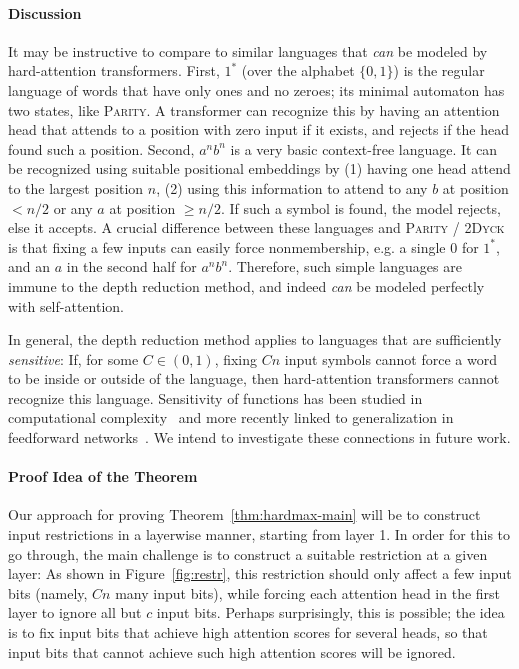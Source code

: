 \documentclass[11pt,a4paper]{article}
\begin{document}
\paragraph{Discussion}
It may be instructive to compare to similar languages that \emph{can} be modeled by hard-attention transformers.
First, $1^*$ (over the alphabet $\{0,1\}$) is the regular language of words that have only ones and no zeroes; its minimal automaton has two states, like \textsc{Parity}.
A transformer can recognize this by having an attention head that attends to a position with zero input if it exists, and rejects if the head found such a position.
Second, $a^nb^n$ is a very basic context-free language.
It can be recognized using suitable positional embeddings by (1) having one head attend to the largest position $n$, (2) using this information to attend to any $b$ at position $<n/2$ or any $a$ at position $\geq n/2$. If such a symbol is found, the model rejects, else it accepts.
A crucial difference between these languages and \textsc{Parity} / \textsc{2Dyck} is that fixing a few inputs can easily force nonmembership, e.g. a single 0 for $1^*$, and an $a$ in the second half for $a^nb^n$.
Therefore, such simple languages are immune to the depth reduction method, and indeed \emph{can} be modeled perfectly with self-attention.

In general, the depth reduction method applies to languages that are sufficiently \emph{sensitive}: If, for some $C \in (0,1)$, fixing $Cn$ input symbols cannot force a word to be inside or outside of the language, then hard-attention transformers cannot recognize this language.
Sensitivity of functions %
has been studied in computational complexity~\cite{boppana1997average,gopalan2016smooth} and more recently linked to generalization in feedforward networks~\cite{de2018deep}.
We intend to investigate these connections in future work.



\paragraph{Proof Idea of the Theorem}
Our approach for proving Theorem~\ref{thm:hardmax-main} will be to construct input restrictions in a layerwise manner, starting from layer 1. 
In order for this to go through, the main challenge is to construct a suitable restriction at a given layer:
As shown in Figure~\ref{fig:restr}, this restriction should only affect a few input bits (namely, $Cn$ many input bits), while forcing each attention head in the first layer to ignore all but $c$ input bits.
Perhaps surprisingly, this is possible; the idea is to fix input bits that achieve high attention scores for several heads, so that input bits that cannot achieve such high attention scores will be ignored.
\end{document}
